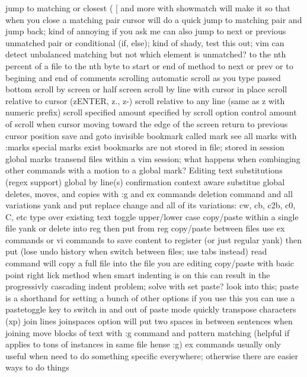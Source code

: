 \documentclass[12pt]{book}
\begin{document}
    jump to matching or closest ( { [ and more with %
      showmatch will make it so that when you close a matching pair cursor will do a quick jump to matching pair and jump back; kind of annoying if you ask me
      can also jump to next or previous unmatched pair or conditional (if, else); kind of shady, test this out; vim can detect unbalanced matching but not which element is unmatched?
    to the nth percent of a file
    to the nth byte
    to start or end of method
    to next or prev { or }
    to begining and end of comments
  scrolling
    automatic scroll as you type passed bottom
    scroll by screen or half screen
    scroll by line with cursor in place
    scroll relative to cursor (zENTER, z., z-)
    scroll relative to any line (same as z with numeric prefix)
    scroll specified amount specified by scroll option
    control amount of scroll when cursor moving toward the edge of the screen
  return to previous cursor position
  save and goto invisible bookmark  called mark
    see all marks with :marks
    special marks exist
    bookmarks are not stored in file; stored in session
    global marks transend files within a vim session; what happens when combinging other commands with a motion to a global mark?
Editing text
  substitutions (regex support)
    global
    by line(s)
    confirmation
    context aware substitue
  global deletes, moves, and copies with :g and ex commands
  deletion command and all variations
  yank and put
  replace
    change and all of its variations: cw, cb, c2b, c0, C, etc
    type over existing text
  toggle upper/lower case
  copy/paste within a single file
    yank or delete into reg then put from reg
  copy/paste between files
    use ex commands or vi commands to save content to register (or just regular yank) then put (lose undo history when switch between files; use tabs instead)
    read command will copy a full file into the file you are editing
  copy/paste with basic point right lick method
    when smart indenting is on this can result in the progressivly cascading indent problem;
      solve with set paste?  look into this; paste is a shorthand for setting a bunch of other options
      if you use this you can use a pastetoggle key to switch in and out of paste mode quickly
  transpose characters (xp)
  join lines
    joinspaces option will put two spaces in between sentences when joining
  move blocks of text
    with :g command and pattern matching (helpful if applies to tons of instances in same file hense :g)
  ex commands
    usually only useful when need to do something specific everywhere; otherwise there are easier ways to do things
}
\end{document}
